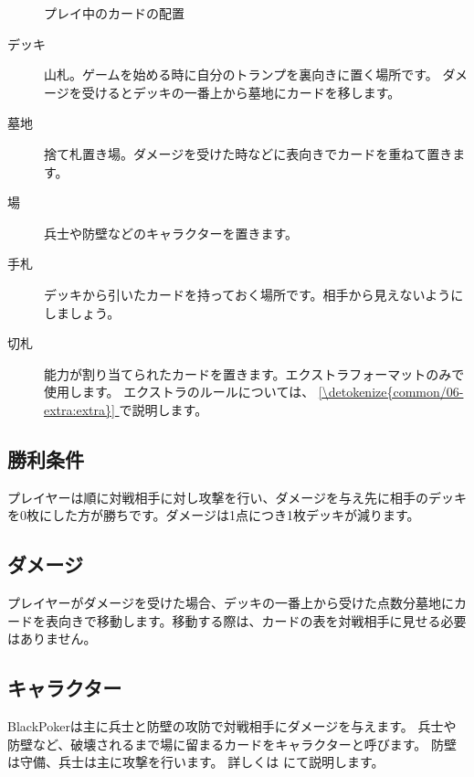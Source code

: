 \documentclass[letterpaper,10pt,dvipdfmx]{sphinxmanual}
\begin{document}
\begin{figure}[htbp]
\centering
\capstart

\noindent{}
\caption{プレイ中のカードの配置}\label{\detokenize{common/01-base:id12}}\label{\detokenize{common/01-base:field-ex}}\end{figure}
\begin{description}
\item[{デッキ}] \leavevmode
山札。ゲームを始める時に自分のトランプを裏向きに置く場所です。
ダメージを受けるとデッキの一番上から墓地にカードを移します。

\item[{墓地}] \leavevmode
捨て札置き場。ダメージを受けた時などに表向きでカードを重ねて置きます。

\item[{場}] \leavevmode
兵士や防壁などのキャラクターを置きます。

\item[{手札}] \leavevmode
デッキから引いたカードを持っておく場所です。相手から見えないようにしましょう。

\item[{切札}] \leavevmode
能力が割り当てられたカードを置きます。エクストラフォーマットのみで使用します。
エクストラのルールについては、 \hyperref[\detokenize{common/06-extra:extra}]{\ref{\detokenize{common/06-extra:extra}} } で説明します。

\end{description}


\subsection{勝利条件}
\label{\detokenize{common/01-base:id7}}
プレイヤーは順に対戦相手に対し攻撃を行い、ダメージを与え先に相手のデッキを0枚にした方が勝ちです。ダメージは1点につき1枚デッキが減ります。


\subsection{ダメージ}
\label{\detokenize{common/01-base:id8}}
プレイヤーがダメージを受けた場合、デッキの一番上から受けた点数分墓地にカードを表向きで移動します。移動する際は、カードの表を対戦相手に見せる必要はありません。


\subsection{キャラクター}
\label{\detokenize{common/01-base:id9}}
BlackPokerは主に兵士と防壁の攻防で対戦相手にダメージを与えます。
兵士や防壁など、破壊されるまで場に留まるカードをキャラクターと呼びます。
防壁は守備、兵士は主に攻撃を行います。
詳しくは {\hyperref[\detokenize{common/04-character::doc}]{}} にて説明します。
\end{document}
